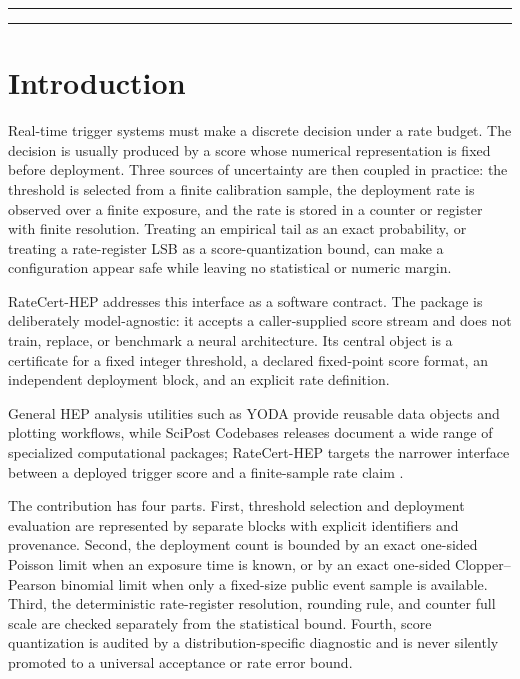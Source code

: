\documentclass[submission, Phys]{SciPost}
\begin{document}
\vspace{10pt}
\noindent\rule{\textwidth}{1pt}
\tableofcontents\thispagestyle{fancy}
\noindent\rule{\textwidth}{1pt}
\vspace{10pt}

\section{Introduction}
\label{sec:intro}

Real-time trigger systems must make a discrete decision under a rate budget.
The decision is usually produced by a score whose numerical representation is
fixed before deployment.  Three sources of uncertainty are then coupled in
practice: the threshold is selected from a finite calibration sample, the
deployment rate is observed over a finite exposure, and the rate is stored in a
counter or register with finite resolution.  Treating an empirical tail as an
exact probability, or treating a rate-register LSB as a score-quantization
bound, can make a configuration appear safe while leaving no statistical or
numeric margin.

RateCert-HEP addresses this interface as a software contract.  The package is
deliberately model-agnostic: it accepts a caller-supplied score stream and does
not train, replace, or benchmark a neural architecture.  Its central object is
a certificate for a fixed integer threshold, a declared fixed-point score
format, an independent deployment block, and an explicit rate definition.

General HEP analysis utilities such as YODA provide reusable data objects and
plotting workflows, while SciPost Codebases releases document a wide range of
specialized computational packages; RateCert-HEP targets the narrower interface
between a deployed trigger score and a finite-sample rate claim
\cite{YODA,SciPostCodebases}.

The contribution has four parts.  First, threshold selection and deployment
evaluation are represented by separate blocks with explicit identifiers and
provenance.  Second, the deployment count is bounded by an exact one-sided
Poisson limit when an exposure time is known, or by an exact one-sided
Clopper--Pearson binomial limit when only a fixed-size public event sample is
available.  Third, the deterministic rate-register resolution, rounding rule,
and counter full scale are checked separately from the statistical bound.
Fourth, score quantization is audited by a distribution-specific diagnostic and
is never silently promoted to a universal acceptance or rate error bound.
\end{document}
